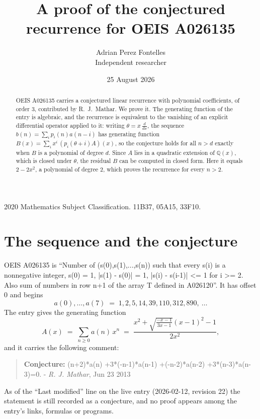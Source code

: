 \documentclass[11pt,a4paper]{article}
\title{A proof of the conjectured recurrence for OEIS A026135}
\author{Adrian Perez Fontelles\\ \small Independent researcher}
\date{25 August 2026}
\theoremstyle{plain}
\theoremstyle{definition}
\begin{document}
\maketitle

\begin{abstract}
OEIS A026135 carries a conjectured linear recurrence with polynomial coefficients, of
order 3, contributed by R.~J.~Mathar. We prove it. The generating function of the
entry is algebraic, and the recurrence is equivalent to the vanishing of an explicit
differential operator applied to it: writing $\theta=x\,\frac{d}{dx}$, the sequence
$b(n)=\sum_{i}p_{i}(n)a(n-i)$ has generating function
$B(x)=\sum_{i}x^{i}\,(p_{i}(\theta+i)A)(x)$, so the conjecture holds for all $n>d$ exactly
when $B$ is a polynomial of degree $d$. Since $A$ lies in a quadratic extension of
$\mathbb{Q}(x)$, which is closed under $\theta$, the residual $B$ can be computed in
closed form. Here it equals $2 - 2 x^{2}$, a polynomial of degree $2$, which proves
the recurrence for every $n>2$.
\end{abstract}

\noindent\small 2020 Mathematics Subject Classification. 11B37, 05A15, 33F10.\normalsize

\section{The sequence and the conjecture}

OEIS A026135 is ``Number of (s(0),s(1),...,s(n)) such that every s(i) is a nonnegative integer, s(0) = 1, |s(1) - s(0)| = 1, |s(i) - s(i-1)| <= 1 for i >= 2. Also sum of numbers in row n+1 of the array T defined in A026120''. It has offset $0$ and begins
\[
a(0),\dots,a(7)\;=\;1, 2, 5, 14, 39, 110, 312, 890,\ \dots
\]
The entry gives the generating function
\begin{equation}\label{eq:gf}
A(x)\;=\;\sum_{n\ge 0} a(n)\,x^{n}\;=\;\frac{x^{2} + \sqrt{\frac{- x - 1}{3 x - 1}} \left(x - 1\right)^{2} - 1}{2 x^{2}} ,
\end{equation}
and it carries the following comment:
\begin{quote}\small
\textbf{Conjecture:} (n+2)*a(n) +3*(-n-1)*a(n-1) +(-n-2)*a(n-2) +3*(n-3)*a(n-3)=0. - \emph{R. J. Mathar}, Jun 23 2013
\end{quote}
As of the ``Last modified'' line on the live entry (2026-02-12, revision 22) the
statement is still recorded as a conjecture, and no proof appears among the entry's links,
formulas or programs.
\end{document}
